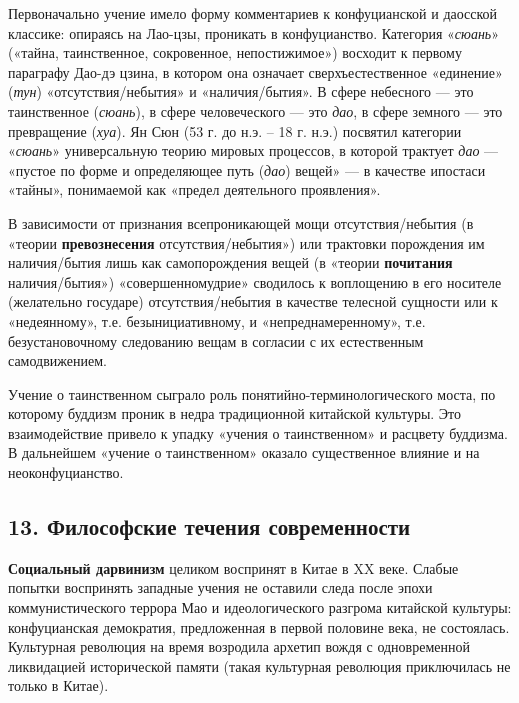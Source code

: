 \documentclass[twoside,a4paper]{article}
\begin{document}
{
Первоначально учение имело форму комментариев к конфуцианской и даосской классике: {\textquotedbl}опираясь на Лао-цзы,
проникать в конфуцианство{\textquotedbl}. Категория «\textit{сюань}» («тайна, таинственное, сокровенное, непостижимое»)
восходит к первому параграфу Дао-дэ цзина, в котором она означает сверхъестественное «единение» (\textit{тун})
«отсутствия/небытия» и «наличия/бытия». В сфере небесного — это таинственное (\textit{сюань}), в сфере человеческого —
это \textit{дао}, в сфере земного — это превращение (\textit{хуа}). Ян Сюн (53 г. до н.э. – 18 г. н.э.) посвятил
категории «\textit{сюань}» универсальную теорию мировых процессов, в которой трактует \textit{дао} — «пустое по форме и
определяющее путь (\textit{дао}) вещей» — в качестве ипостаси «тайны», понимаемой как «предел деятельного проявления».
}

{
В зависимости от признания всепроникающей мощи отсутствия/небытия (в «теории \textbf{превознесения} отсутствия/небытия»)
или трактовки порождения им наличия/бытия лишь как самопорождения вещей (в «теории \textbf{почитания} наличия/бытия»)
«совершенномудрие» сводилось к воплощению в его носителе (желательно государе) отсутствия/небытия в качестве телесной
сущности или к «недеянному», т.е. безынициативному, и «непреднамеренному», т.е. безустановочному следованию вещам в
согласии с их естественным самодвижением. }

{
Учение о таинственном сыграло роль понятийно-терминологического моста, по которому буддизм проник в недра традиционной
китайской культуры. Это взаимодействие привело к упадку «учения о таинственном» и расцвету буддизма. В дальнейшем
«учение о таинственном» оказало существенное влияние и на неоконфуцианство. }

\subsection[13.
\textcyrillic{Ф}\textcyrillic{и}\textcyrillic{л}\textcyrillic{о}\textcyrillic{с}\textcyrillic{о}\textcyrillic{ф}\textcyrillic{с}\textcyrillic{к}\textcyrillic{и}\textcyrillic{е}
\textcyrillic{т}\textcyrillic{е}\textcyrillic{ч}\textcyrillic{е}\textcyrillic{н}\textcyrillic{и}\textcyrillic{я}
\textcyrillic{с}\textcyrillic{о}\textcyrillic{в}\textcyrillic{р}\textcyrillic{е}\textcyrillic{м}\textcyrillic{е}\textcyrillic{н}\textcyrillic{н}\textcyrillic{о}\textcyrillic{с}\textcyrillic{т}\textcyrillic{и}]{\foreignlanguage{russian}{13.
Философские течения современности}}
{
\textbf{Социальный дарвинизм} целиком воспринят в Китае в \foreignlanguage{english}{XX} веке. Слабые попытки воспринять
западные учения не оставили следа после эпохи коммунистического террора Мао и идеологического разгрома китайской
культуры: {\textquotedbl}конфуцианская демократия{\textquotedbl}, предложенная в первой половине века, не состоялась.
{\textquotedbl}Культурная революция{\textquotedbl} на время возродила архетип вождя с одновременной ликвидацией
исторической памяти (такая {\textquotedbl}культурная{\textquotedbl} {\textquotedbl}революция{\textquotedbl}
приключилась не только в Китае). }
\end{document}
